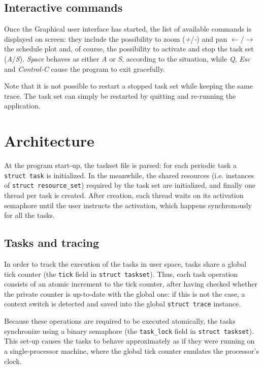 \documentclass[paper=a4, fontsize=11pt]{scrartcl}
\newcommand{\mono}[1]{\texttt{#1}}
\numberwithin{equation}{section}        %
\numberwithin{figure}{section}          %
\numberwithin{table}{section}               %
\numberwithin{fragment}{section}
\begin{document}
\subsection{Interactive commands}
Once the Graphical user interface has started, the list of available commands is displayed on screen: they include the possibility to zoom (\textit{+}/\textit{-}) and pan $\leftarrow$/$\rightarrow$ the schedule plot and, of course, the possibility to activate and stop the task set (\textit{A}/\textit{S}). \textit{Space} behaves as either \textit{A} or \textit{S}, according to the situation, while \textit{Q}, \textit{Esc} and \textit{Control-C} cause the program to exit gracefully.

Note that it is not possible to restart a stopped task set while keeping the same trace. The task set can simply be restarted by quitting and re-running the application.


\section{Architecture}\label{sec:arch}

At the program start-up, the taskset file is parsed: for each periodic task a \mono{struct task} is initialized. In the meanwhile, the shared resources (i.e. instances of \mono{struct resource\_set}) required by the task set are initialized, and finally one thread per task is created. After creation, each thread waits on its activation semaphore until the user instructs the activation, which happens synchronously for all the tasks.

\subsection{Tasks and tracing}\label{sec:tasks}
In order to track the execution of the tasks in user space, tasks share a global tick counter (the \mono{tick} field in \mono{struct taskset}).
Thus, each task operation consists of an atomic increment to the tick counter, after having checked whether the private counter is up-to-date with the global one: if this is not the case, a context switch is detected and saved into the global \mono{struct trace} instance.

Because these operations are required to be executed atomically, the tasks synchronize using a binary semaphore (the \mono{task\_lock} field in \mono{struct taskset}).
This set-up causes the tasks to behave approximately as if they were running on a single-processor machine, where the global tick counter emulates the processor's clock.
\end{document}
